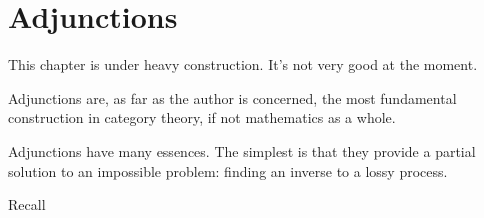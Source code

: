 \documentclass[main.tex]{subfiles}
\begin{document}
\chapter{Adjunctions}\label{sec:adjunctions}

\begin{note}
  This chapter is under heavy construction. It's not very good at the moment.
\end{note}

Adjunctions are, as far as the author is concerned, the most fundamental construction in category theory, if not mathematics as a whole.

Adjunctions have many essences. The simplest is that they provide a partial solution to an impossible problem: finding an inverse to a lossy process.

Recall
\end{document}
